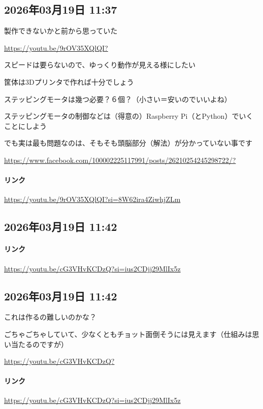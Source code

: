 \subsection*{2026年03月19日 11:37}

製作できないかと前から思っていた

\url{https://youtu.be/9rOV35XQlQI?}

スピードは要らないので、ゆっくり動作が見える様にしたい

筐体は3Dプリンタで作れば十分でしょう

ステッピングモータは幾つ必要？６個？（小さい＝安いのでいいよね）

ステッピングモータの制御などは（得意の）Raspberry Pi（とPython）でいくことにしよう

でも実は最も問題なのは、そもそも頭脳部分（解法）が分かっていない事です

\url{https://www.facebook.com/100002225117991/posts/26210254245298722/?}

\paragraph{リンク}
\url{https://youtu.be/9rOV35XQlQI?si=8W62ira4ZiwhjZLm}

\subsection*{2026年03月19日 11:42}

\paragraph{リンク}
\url{https://youtu.be/cG3VHvKCDzQ?si=ius2CDjj29MlIx5z}

\subsection*{2026年03月19日 11:42}

これは作るの難しいのかな？

ごちゃごちゃしていて、少なくともチョット面倒そうには見えます（仕組みは思い当たるのですが）

\url{https://youtu.be/cG3VHvKCDzQ?}

\paragraph{リンク}
\url{https://youtu.be/cG3VHvKCDzQ?si=ius2CDjj29MlIx5z}

